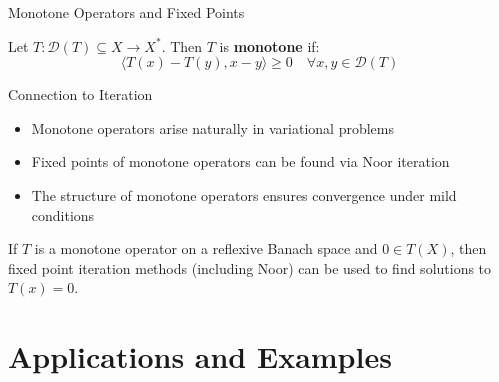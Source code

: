 \documentclass[aspectratio=169,10pt]{beamer}
\begin{document}
\begin{frame}{Monotone Operators and Fixed Points}

\begin{definition}
Let $T: \mathcal{D}(T) \subseteq X \to X^*$. Then $T$ is \textbf{monotone} if:
$$\langle T(x) - T(y), x - y \rangle \geq 0 \quad \forall x,y \in \mathcal{D}(T)$$
\end{definition}

\vspace{0.3cm}

\begin{block}{Connection to Iteration}
\begin{itemize}
  \item Monotone operators arise naturally in variational problems
  \item Fixed points of monotone operators can be found via Noor iteration
  \item The structure of monotone operators ensures convergence under mild conditions
\end{itemize}
\end{block}

\vspace{0.3cm}

\begin{theorem}
If $T$ is a monotone operator on a reflexive Banach space and $0 \in T(X)$, then fixed point iteration methods (including Noor) can be used to find solutions to $T(x) = 0$.
\end{theorem}

\end{frame}


\section{Applications and Examples}
\end{document}
